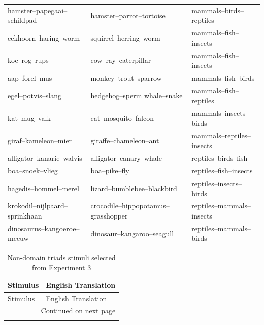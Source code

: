 \documentclass[doc]{apa6}
\begin{document}
\begin{appendix}
\begin{small}
\begin{longtable}{lll}
hamster--papegaai--schildpad & hamster--parrot--tortoise & mammals--birds--reptiles \\
eekhoorn--haring--worm & squirrel--herring--worm & mammals--fish--insects \\
koe--rog--rups & cow--ray--caterpillar & mammals--fish--insects \\
aap--forel--mus & monkey--trout--sparrow & mammals--fish--birds \\
egel--potvis--slang & hedgehog--sperm whale--snake & mammals--fish--reptiles \\
kat--mug--valk & cat--mosquito--falcon & mammals--insects--birds \\
giraf--kameleon--mier & giraffe--chameleon--ant & mammals--reptiles--insects \\
alligator--kanarie--walvis & alligator--canary--whale & reptiles--birds--fish \\
boa--snoek--vlieg & boa--pike--fly & reptiles--fish--insects \\
hagedis--hommel--merel & lizard--bumblebee--blackbird & reptiles--insects--birds \\
krokodil--nijlpaard--sprinkhaan & crocodile--hippopotamus--grasshopper & reptiles--mammals--insects \\
dinosaurus--kangoeroe--meeuw & dinosaur--kangaroo--seagull & reptiles--mammals--birds \\
\end{longtable}
\end{small}

\clearpage

\begin{small}
\begin{longtable}{ll}
\caption{Non-domain triads stimuli selected from Experiment 3}\\

Stimulus  & English Translation\\
\toprule
\endfirsthead

Stimulus  & English Translation\\
\toprule
\endhead

\bottomrule
\multicolumn{2}{r}{Continued on next page} \\
\endfoot

\bottomrule
\endlastfoot


\end{longtable}
\end{small}
\end{appendix}
\end{document}
